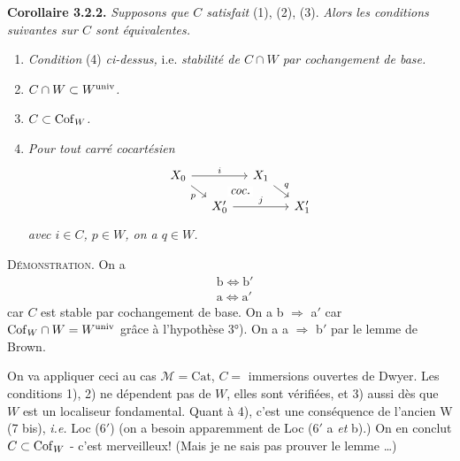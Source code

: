 \textbf{Corollaire 3.2.2.} \textit{Supposons que $C$ satisfait} (1), (2), (3). \textit{Alors}
\textit{les conditions suivantes sur $C$ sont équivalentes.}
\begin{enumerate}
\item[a)] \textit{Condition} (4) \textit{ci-dessus,} i.e. \textit{stabilité de $C \cap W$ par cochangement de base.}
\item[a$'$)] \textit{$C \cap W \subset W^{\mathrm{univ}}$.}
\item[b)] \textit{$C \subset \mathrm{Cof}_W$.}
\item[b$'$)] \textit{Pour tout carré cocartésien}
\[
\begin{tikzcd}[ampersand replacement=\&, row sep=small, column sep=small]
X_0 \arrow[rr, "i"] \arrow[dr, "p"'] \arrow[to=2-4, phantom, "\textit{coc.}" description] \& \& X_1 \arrow[dr, "q"] \& \\
\& X'_0 \arrow[rr, "j"] \& \& X'_1
\end{tikzcd}
\]
\textit{avec $i \in C$, $p \in W$, on a $q \in W$.}
\end{enumerate}
\textsc{Démonstration}. On a
\[
\begin{aligned}
&\text{b} \iff \text{b}'\\
&\text{a} \iff \text{a}'
\end{aligned}
\]
car $C$ est stable par cochangement de base. On a b $\Longrightarrow$ a$'$ car $\mathrm{Cof}_W \cap W = W^{\mathrm{univ}}$ grâce à l'hypothèse 3°). On a a $\Longrightarrow$ b$'$ par le lemme de Brown.

On va appliquer ceci au cas $\mathcal{M} = \mathrm{Cat}$, $C =$ immersions ouvertes de Dwyer. Les conditions 1), 2) ne dépendent pas de $W$, elles sont vérifiées, et 3) aussi dès que $W$ est un localiseur fondamental. Quant à 4), c'est une conséquence de l'ancien W (7 bis), \textit{i.e.} Loc (6$'$) (on a
besoin apparemment de Loc (6$'$ a \textit{et} b).) On en conclut $C \subset \mathrm{Cof}_W$ - c'est merveilleux! (Mais je ne sais pas prouver le lemme \dots)

